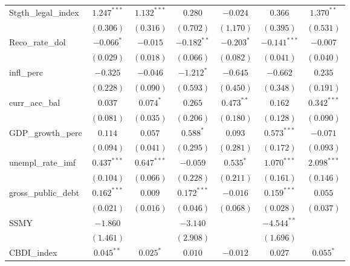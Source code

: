 \begin{table}
\begin{center}
\begin{tabular}{l c c c c c c}
Stgth\_legal\_index & $1.247^{***}$  & $1.132^{***}$  & $0.280$        & $-0.024$     & $0.366$        & $1.370^{**}$  \\
                    & $(0.306)$      & $(0.316)$      & $(0.702)$      & $(1.170)$    & $(0.395)$      & $(0.531)$     \\
Reco\_rate\_dol     & $-0.066^{*}$   & $-0.015$       & $-0.182^{**}$  & $-0.203^{*}$ & $-0.141^{***}$ & $-0.007$      \\
                    & $(0.029)$      & $(0.018)$      & $(0.066)$      & $(0.082)$    & $(0.041)$      & $(0.040)$     \\
infl\_perc          & $-0.325$       & $-0.046$       & $-1.212^{*}$   & $-0.645$     & $-0.662$       & $0.235$       \\
                    & $(0.228)$      & $(0.090)$      & $(0.593)$      & $(0.450)$    & $(0.348)$      & $(0.191)$     \\
curr\_acc\_bal      & $0.037$        & $0.074^{*}$    & $0.265$        & $0.473^{**}$ & $0.162$        & $0.342^{***}$ \\
                    & $(0.081)$      & $(0.035)$      & $(0.206)$      & $(0.180)$    & $(0.128)$      & $(0.090)$     \\
GDP\_growth\_perc   & $0.114$        & $0.057$        & $0.588^{*}$    & $0.093$      & $0.573^{***}$  & $-0.071$      \\
                    & $(0.094)$      & $(0.041)$      & $(0.295)$      & $(0.281)$    & $(0.172)$      & $(0.093)$     \\
unempl\_rate\_imf   & $0.437^{***}$  & $0.647^{***}$  & $-0.059$       & $0.535^{*}$  & $1.070^{***}$  & $2.098^{***}$ \\
                    & $(0.104)$      & $(0.066)$      & $(0.228)$      & $(0.211)$    & $(0.161)$      & $(0.146)$     \\
gross\_public\_debt & $0.162^{***}$  & $0.009$        & $0.172^{***}$  & $-0.016$     & $0.159^{***}$  & $0.055$       \\
                    & $(0.021)$      & $(0.016)$      & $(0.046)$      & $(0.068)$    & $(0.028)$      & $(0.037)$     \\
SSMY                & $-1.860$       &                & $-3.140$       &              & $-4.544^{**}$  &               \\
                    & $(1.461)$      &                & $(2.908)$      &              & $(1.696)$      &               \\
CBDI\_index         & $0.045^{**}$   & $0.025^{*}$    & $0.010$        & $-0.012$     & $0.027$        & $0.055^{*}$   \\

\end{tabular}
\end{center}
\end{table}
